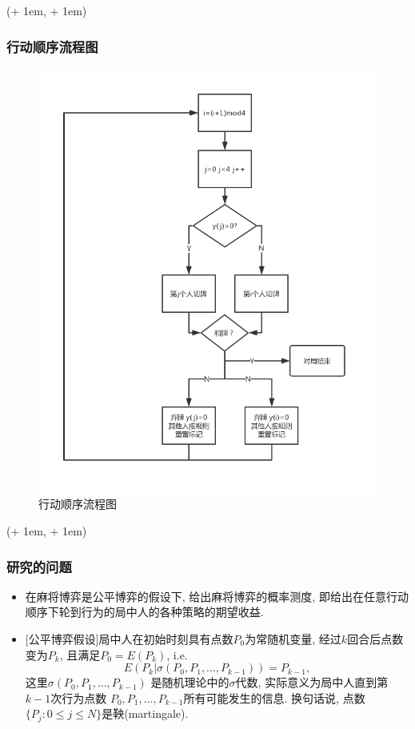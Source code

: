 \documentclass[xcolor=dvipsnames]{ctexbeamer}
\newcommand{\FrameTextCrono}[1]{
    \begin{textblock*}{\paperwidth}(\textwidth + 1em, \textheight + 1em)
        #1
    \end{textblock*}
}
\let\oldframe\frame
\let\oldendframe\endframe
\renewenvironment{frame}
    {\oldframe\FrameTextCrono{\small\color{blue}{\crono}}}
    {\oldendframe}
\begin{document}
    \begin{frame}
        \frametitle{行动顺序流程图}
        \begin{figure}[H]
            \centering
            \includegraphics[scale=0.18]{flowchart_order.png}
            \caption{行动顺序流程图}
        \end{figure}
    \end{frame}

    \begin{frame}
        \frametitle{研究的问题}
        \begin{itemize}
            \item 在麻将博弈是公平博弈的假设下, 给出麻将博弈的概率测度,
                即给出在任意行动顺序下轮到行为的局中人的各种策略的期望收益.
            \item {[\alert{公平博弈假设}]}局中人在初始时刻具有点数$P_{0}$为常随机变量,
                经过$k$回合后点数变为$P_{k}$, 且满足$P_{0} = E(P_{k})$,
                i.e.
                \begin{equation}
                    E(P_{k}|\sigma(P_{0}, P_{1}, \dotsc, P_{k-1})) = P_{k-1},
                \end{equation}
                这里$\sigma(P_{0}, P_{1}, \dotsc, P_{k-1})$
                是随机理论中的$\sigma$代数,
                实际意义为局中人直到第$k-1$次行为点数
                $P_{0}, P_{1}, \dotsc, P_{k-1}$所有可能发生的信息.
                换句话说, 点数$\{P_{j}: 0\leq j\leq N\}$是鞅(martingale).
        \end{itemize}
    \end{frame}
\end{document}
